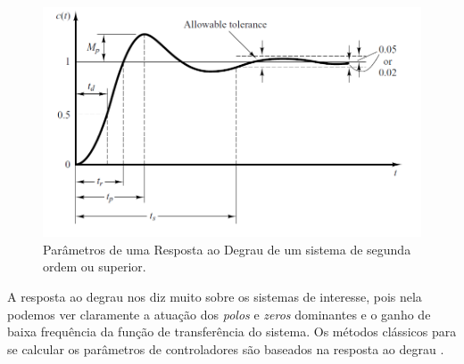 \begin{figure}[htb]
  \caption{Parâmetros de uma Resposta ao Degrau de um sistema de segunda ordem ou superior.}
  \begin{center}
      \includegraphics[scale=0.5]{img/transient_ogata_p170}
  \end{center}
  \label{fig:transient_ogata_p170}
\end{figure}

A resposta ao degrau nos diz muito sobre os sistemas de interesse, pois nela podemos ver claramente a atuação dos \textit{polos} e \textit{zeros} dominantes e o ganho de baixa frequência da função de transferência do sistema. Os métodos clássicos para se calcular os parâmetros de controladores são baseados na resposta ao degrau \cite{Ogata}. 







